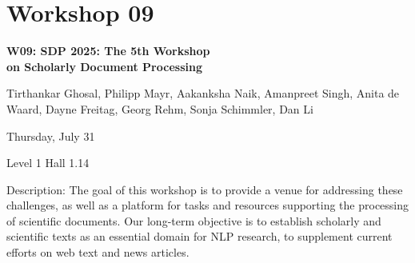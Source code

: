 \clearpage


\section[W09: SDP 2025: The 5th Workshop on Scholarly Document Processing]{Workshop 09}
\label{workshop_9}

\begin{center}
    {\Large \textbf{W09: SDP 2025: The 5th Workshop \\
    on Scholarly Document Processing}}\\

 \vspace{5mm}

    Tirthankar Ghosal, Philipp Mayr, Aakanksha Naik, Amanpreet Singh, Anita de Waard, Dayne Freitag, Georg Rehm, Sonja Schimmler, Dan Li\\

 \vspace{5mm}
 
    Thursday, July 31
    
    Level 1 Hall 1.14

\end{center}

Description: The goal of this workshop is to provide a venue for addressing these challenges, as well as a platform for tasks and resources supporting the processing of scientific documents. Our long-term objective is to establish scholarly and scientific texts as an essential domain for NLP research, to supplement current efforts on web text and news articles.

